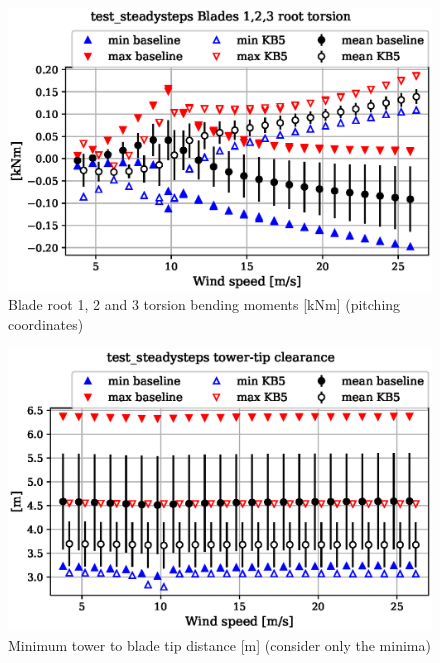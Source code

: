 \begin{figure}[!ht]
\begin{center}
	\includegraphics[width=.85\linewidth]{figures/baseline-vs-KB6/test_steadysteps/blade1-blade1-node-001-momentvec-z_AA0008_AA0008.eps}
\end{center}
\caption{Blade root 1, 2 and 3 torsion bending moments [kNm] (pitching coordinates)}
\label{fig:baseline-vs-KB6:test_steadysteps:blade-root-torsion}
\end{figure}

\begin{figure}[!ht]
\begin{center}
	\includegraphics[width=.85\linewidth]{figures/baseline-vs-KB6/test_steadysteps/DLL-towerclearance_mblade-inpvec-1_AA0008_AA0008.eps}
\end{center}
\caption{Minimum tower to blade tip distance [m] (consider only the minima)}
\label{fig:baseline-vs-KB6:test_steadysteps:tower-tip-clearance}
\end{figure}

